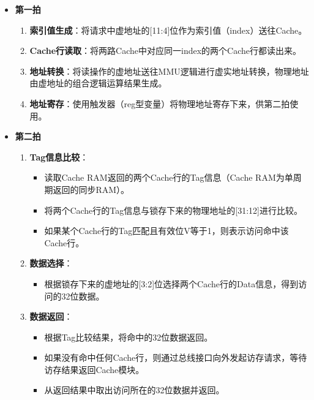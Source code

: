 \begin{itemize}
\item
  \textbf{第一拍}

  \begin{enumerate}
  \def\labelenumi{\arabic{enumi}.}
  \tightlist
  \item
    \textbf{索引值生成}：将请求中虚地址的{[}11:4{]}位作为索引值（index）送往Cache。
  \item
    \textbf{Cache行读取}：将两路Cache中对应同一index的两个Cache行都读出来。
  \item
    \textbf{地址转换}：将读操作的虚地址送往MMU逻辑进行虚实地址转换，物理地址由虚地址的组合逻辑运算结果生成。
  \item
    \textbf{地址寄存}：使用触发器（reg型变量）将物理地址寄存下来，供第二拍使用。
  \end{enumerate}
\item
  \textbf{第二拍}

  \begin{enumerate}
  \def\labelenumi{\arabic{enumi}.}
  \item
    \textbf{Tag信息比较}：

    \begin{itemize}
    \tightlist
    \item
      读取Cache RAM返回的两个Cache行的Tag信息（Cache RAM为单周期返回的同步RAM）。
    \item
      将两个Cache行的Tag信息与锁存下来的物理地址的{[}31:12{]}进行比较。
    \item
      如果某个Cache行的Tag匹配且有效位V等于1，则表示访问命中该Cache行。
    \end{itemize}
  \item
    \textbf{数据选择}：

    \begin{itemize}
    \tightlist
    \item
      根据锁存下来的虚地址的{[}3:2{]}位选择两个Cache行的Data信息，得到访问的32位数据。
    \end{itemize}
  \item
    \textbf{数据返回}：

    \begin{itemize}
    \item
      根据Tag比较结果，将命中的32位数据返回。
    \item
      如果没有命中任何Cache行，则通过总线接口向外发起访存请求，等待访存结果返回Cache模块。
    \item
      从返回结果中取出访问所在的32位数据并返回。
    \end{itemize}
  \end{enumerate}
\end{itemize}

